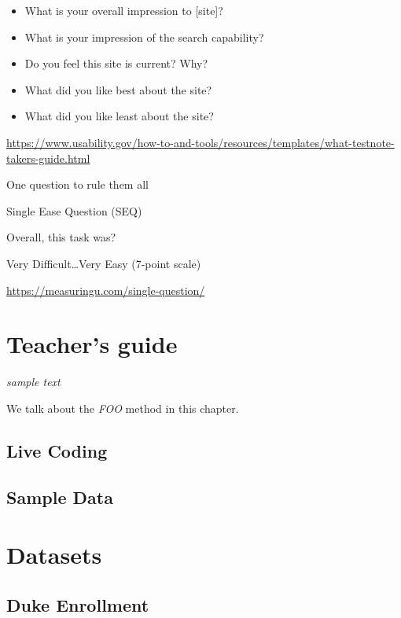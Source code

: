\documentclass[
]{krantz}
\providecommand{\tightlist}{%
  \setlength{\itemsep}{0pt}\setlength{\parskip}{0pt}}
\begin{document}
\begin{itemize}
\tightlist
\item
  What is your overall impression to {[}site{]}?
\item
  What is your impression of the search capability?
\item
  Do you feel this site is current? Why?
\item
  What did you like best about the site?
\item
  What did you like least about the site?
\end{itemize}

\url{https://www.usability.gov/how-to-and-tools/resources/templates/what-testnote-takers-guide.html}

One question to rule them all

Single Ease Question (SEQ)

Overall, this task was?

Very Difficult\ldots Very Easy
(7-point scale)

\url{https://measuringu.com/single-question/}

\hypertarget{teachers-guide}{%
\chapter{Teacher's guide}\label{teachers-guide}}

\emph{sample text}

We talk about the \emph{FOO} method in this chapter.

\hypertarget{live-coding}{%
\section{Live Coding}\label{live-coding}}

\hypertarget{sample-data}{%
\section{Sample Data}\label{sample-data}}

\cleardoublepage

\hypertarget{appendix-appendix}{%
\appendix {}}


\hypertarget{datasets}{%
\chapter{Datasets}\label{datasets}}

\hypertarget{duke-enrollment}{%
\section*{Duke Enrollment}\label{duke-enrollment}}
\end{document}
